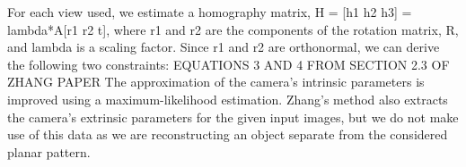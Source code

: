 For each view used, we estimate a homography matrix, H = [h1 h2 h3] = lambda*A[r1 r2 t], where r1 and r2 are the components of the rotation matrix, R, and lambda is a scaling factor.  Since r1 and r2 are orthonormal, we can derive the following two constraints:
EQUATIONS 3 AND 4 FROM SECTION 2.3 OF ZHANG PAPER
The approximation of the camera’s intrinsic parameters is improved using a maximum-likelihood estimation. Zhang’s method also extracts the camera’s extrinsic parameters for the given input images, but we do not make use of this data as we are reconstructing an object separate from the considered planar pattern. 
